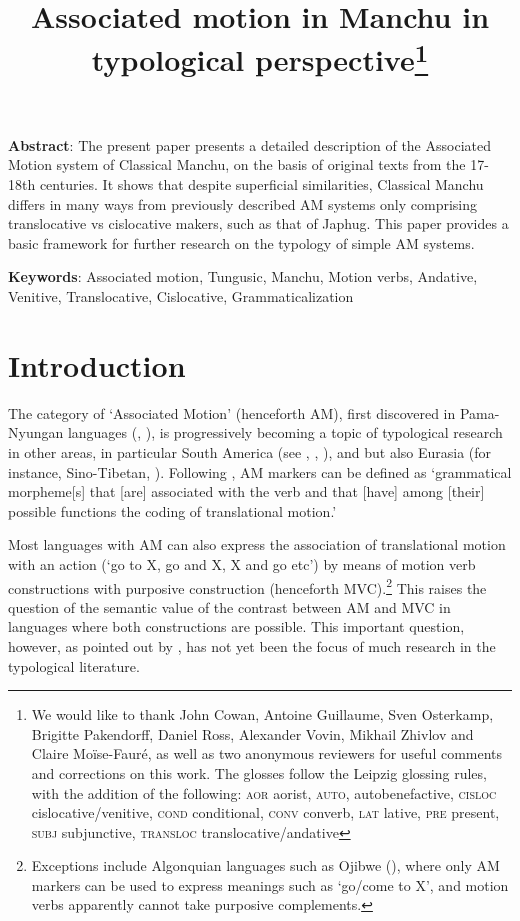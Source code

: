 \documentclass{article}
\begin{document}
 
\title{Associated motion in Manchu in typological perspective\footnote{We would like to thank John Cowan, Antoine Guillaume, Sven Osterkamp, Brigitte Pakendorff, Daniel Ross, Alexander Vovin, Mikhail Zhivlov and Claire Moïse-Fauré, as well as two anonymous reviewers for useful comments and corrections on this work. The glosses follow the Leipzig glossing rules, with the addition of the following: \textsc{aor} aorist, \textsc{auto}, autobenefactive, \textsc{cisloc} cislocative/venitive, \textsc{cond} conditional, \textsc{conv} converb, \textsc{lat} lative,  \textsc{pre} present, \textsc{subj} subjunctive, \textsc{transloc} translocative/andative } }
\maketitle 

\textbf{Abstract}: The present paper presents a detailed description of the Associated Motion system of Classical Manchu, on the basis of original texts from the 17-18th centuries. It shows that despite superficial similarities, Classical Manchu differs in many ways from previously described AM systems only comprising translocative vs cislocative makers, such as that of Japhug. This paper provides a basic framework for further research on the typology of simple AM systems.

\textbf{Keywords}: Associated motion, Tungusic, Manchu, Motion verbs, Andative, Venitive, Translocative, Cislocative, Grammaticalization

\section*{Introduction}
The category of `Associated Motion' (henceforth AM), first discovered in Pama-Nyungan languages (\citealt{koch84associated.motion}, \citealt{wilkins91associated.motion}), is progressively becoming a topic of typological research in other areas, in particular South America (see \citealt{guillaume08cavinena}, \citealt{rose15am}, \citealt{guillaume16am}), and but also Eurasia (for instance, Sino-Tibetan, \citealt{jacques13harmonization}). Following \citet[12]{guillaume16am}, AM markers can be defined as `grammatical morpheme[s] that [are] associated with the verb
and that [have] among [their] possible functions the coding of translational
motion.'

Most languages with AM can also express the association of translational motion with an action (`go to X, go and X, X and go etc')  by means of motion verb constructions with purposive construction (henceforth MVC).\footnote{Exceptions include Algonquian languages such as Ojibwe (\citealt[729-733]{valentine01grammar}), where only AM markers can be used to express meanings such as `go/come to X', and motion verbs apparently cannot take purposive complements.} This raises the question of the semantic value of the contrast between AM and MVC in languages where both constructions are possible. This important question, however, as pointed out by \citet[10]{guillaume16am}, has not yet been the focus of much research in the typological literature.
\end{document}

